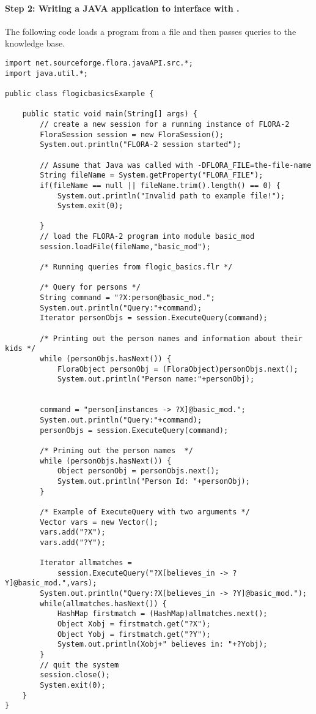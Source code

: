 \paragraph{Step 2:  Writing a JAVA application to interface with \FLORA.}
 The following code loads a \FLORA program from a file and then passes
 queries to the knowledge base.

\begin{verbatim}
import net.sourceforge.flora.javaAPI.src.*;
import java.util.*;

public class flogicbasicsExample {

    public static void main(String[] args) {
        // create a new session for a running instance of FLORA-2
        FloraSession session = new FloraSession();
        System.out.println("FLORA-2 session started");

        // Assume that Java was called with -DFLORA_FILE=the-file-name
        String fileName = System.getProperty("FLORA_FILE");
        if(fileName == null || fileName.trim().length() == 0) {
            System.out.println("Invalid path to example file!");
            System.exit(0);

        }
        // load the FLORA-2 program into module basic_mod
        session.loadFile(fileName,"basic_mod");

        /* Running queries from flogic_basics.flr */

        /* Query for persons */
        String command = "?X:person@basic_mod.";
        System.out.println("Query:"+command);
        Iterator personObjs = session.ExecuteQuery(command);

        /* Printing out the person names and information about their kids */
        while (personObjs.hasNext()) {
            FloraObject personObj = (FloraObject)personObjs.next();
            System.out.println("Person name:"+personObj);


        command = "person[instances -> ?X]@basic_mod.";
        System.out.println("Query:"+command);
        personObjs = session.ExecuteQuery(command);

        /* Prining out the person names  */
        while (personObjs.hasNext()) {
            Object personObj = personObjs.next();
            System.out.println("Person Id: "+personObj);
        }

        /* Example of ExecuteQuery with two arguments */
        Vector vars = new Vector();
        vars.add("?X");
        vars.add("?Y");

        Iterator allmatches =
            session.ExecuteQuery("?X[believes_in -> ?Y]@basic_mod.",vars);
        System.out.println("Query:?X[believes_in -> ?Y]@basic_mod.");
        while(allmatches.hasNext()) {
            HashMap firstmatch = (HashMap)allmatches.next();
            Object Xobj = firstmatch.get("?X");
            Object Yobj = firstmatch.get("?Y");
            System.out.println(Xobj+" believes in: "+?Yobj);
        }
        // quit the system
        session.close();
        System.exit(0);
    }
}
\end{verbatim}

